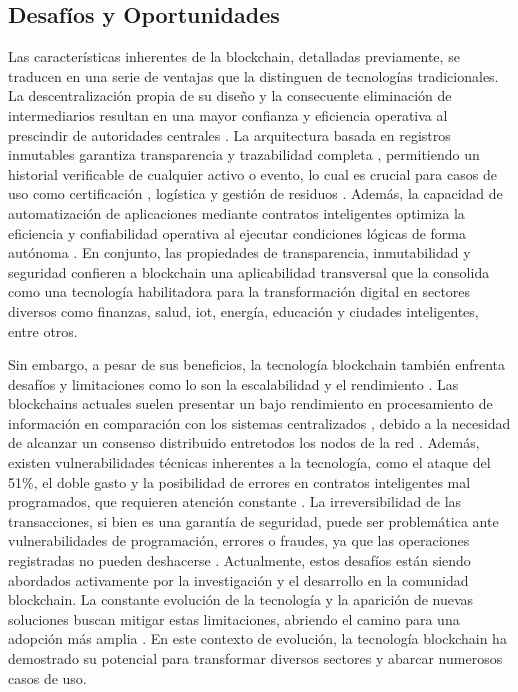 \subsection{Desafíos y Oportunidades}

Las características inherentes de la blockchain, detalladas previamente, se traducen en una serie de ventajas que la distinguen de tecnologías tradicionales. La descentralización propia de su diseño y la consecuente eliminación de intermediarios resultan en una mayor confianza \cite{rejeb2023role} y eficiencia operativa al prescindir de autoridades centrales \cite{sharabati2024blockchain}. La arquitectura basada en registros inmutables garantiza transparencia y trazabilidad completa \cite{sharabati2024blockchain}, permitiendo un historial verificable de cualquier activo o evento, lo cual es crucial para casos de uso como certificación \cite{bartolomeo2020introduccion}, logística \cite{bartolomeo2020introduccion, rejeb2023role} y gestión de residuos \cite{bulkowska2023implementation}. Además, la capacidad de automatización de aplicaciones mediante contratos inteligentes optimiza la eficiencia y confiabilidad operativa al ejecutar condiciones lógicas de forma autónoma \cite{bartolomeo2020introduccion}. En conjunto, las propiedades de transparencia, inmutabilidad y seguridad confieren a blockchain una aplicabilidad transversal que la consolida como una tecnología habilitadora para la transformación digital en sectores diversos como finanzas, salud, \acrshort{iot}, energía, educación y ciudades inteligentes, entre otros.

Sin embargo, a pesar de sus beneficios, la tecnología blockchain también enfrenta desafíos y limitaciones como lo son la escalabilidad y el rendimiento \cite{tripathi2023comprehensive}. Las blockchains actuales suelen presentar un bajo rendimiento en procesamiento de información en comparación con los sistemas centralizados \cite{baralla2023waste}, debido a la necesidad de alcanzar un consenso distribuido entretodos los nodos de la red \cite{tripathi2023comprehensive}. Además, existen vulnerabilidades técnicas inherentes a la tecnología, como el ataque del 51\%, el doble gasto y la posibilidad de errores en contratos inteligentes mal programados, que requieren atención constante \cite{diez2023web}. La irreversibilidad de las transacciones, si bien es una garantía de seguridad, puede ser problemática ante vulnerabilidades de programación, errores o fraudes, ya que las operaciones registradas no pueden deshacerse \cite{taherdoost2023smart}. Actualmente, estos desafíos están siendo abordados activamente por la investigación y el desarrollo en la comunidad blockchain. La constante evolución de la tecnología y la aparición de nuevas soluciones buscan mitigar estas limitaciones, abriendo el camino para una adopción más amplia \cite{tripathi2023comprehensive, baralla2023waste, taherdoost2023smart}. En este contexto de evolución, la tecnología blockchain ha demostrado su potencial para transformar diversos sectores y abarcar numerosos casos de uso.

